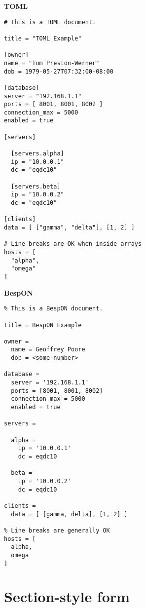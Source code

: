 \documentclass[11pt]{article}
\begin{document}
{{\begin{appendices}
\begin{tcolorbox}{}
\begin{multicols}{2}

\centering \textbf{TOML}
\begin{Verbatim}[formatcom=\color{DarkGreen}]
# This is a TOML document.

title = "TOML Example"

[owner]
name = "Tom Preston-Werner"
dob = 1979-05-27T07:32:00-08:00

[database]
server = "192.168.1.1"
ports = [ 8001, 8001, 8002 ]
connection_max = 5000
enabled = true

[servers]

  [servers.alpha]
  ip = "10.0.0.1"
  dc = "eqdc10"

  [servers.beta]
  ip = "10.0.0.2"
  dc = "eqdc10"

[clients]
data = [ ["gamma", "delta"], [1, 2] ]

# Line breaks are OK when inside arrays
hosts = [
  "alpha",
  "omega"
]
\end{Verbatim}
\columnbreak
\centering \textbf{BespON}

\begin{Verbatim}
% This is a BespON document.

title = BespON Example

owner =
  name = Geoffrey Poore
  dob = <some number>

database =
  server = '192.168.1.1'
  ports = [8001, 8001, 8002]
  connection_max = 5000
  enabled = true

servers =

  alpha = 
    ip = '10.0.0.1'
    dc = eqdc10

  beta =
    ip = '10.0.0.2'
    dc = eqdc10

clients =
  data = [ [gamma, delta], [1, 2] ]

% Line breaks are generally OK
hosts = [
  alpha,
  omega
]
\end{Verbatim}
\end{multicols}
\end{tcolorbox}



\section{Section-style form}




\begin{tcolorbox}{}
\begin{multicols}{2}


\end{multicols}
\end{tcolorbox}
\end{appendices}}}
\end{document}
